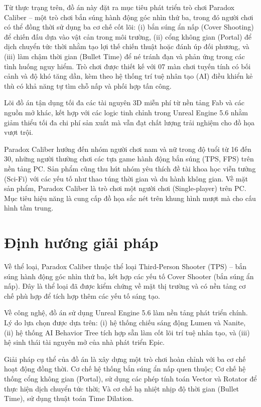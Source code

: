 \documentclass[../DoAn.tex]{subfiles}
\begin{document}
Từ thực trạng trên, đồ án này đặt ra mục tiêu phát triển trò chơi Paradox Caliber -- một trò chơi bắn súng hành động góc nhìn thứ ba, trong đó người chơi có thể đồng thời sử dụng ba cơ chế cốt lõi: (i) bắn súng ẩn nấp (Cover Shooting) để chiến đấu dựa vào vật cản trong môi trường, (ii) cổng không gian (Portal) để dịch chuyển tức thời nhằm tạo lợi thế chiến thuật hoặc đánh úp đối phương, và (iii) làm chậm thời gian (Bullet Time) để né tránh đạn và phản ứng trong các tình huống nguy hiểm. Trò chơi được thiết kế với 07 màn chơi tuyến tính có bối cảnh và độ khó tăng dần, kèm theo hệ thống trí tuệ nhân tạo (AI) điều khiển kẻ thù có khả năng tự tìm chỗ nấp và phối hợp tấn công.

Lõi đồ án tận dụng tối đa các tài nguyên 3D miễn phí từ nền tảng Fab và các nguồn mở khác, kết hợp với các logic tinh chỉnh trong Unreal Engine 5.6 nhằm giảm thiểu tối đa chi phí sản xuất mà vẫn đạt chất lượng trải nghiệm cho đồ họa vượt trội.

Paradox Caliber hướng đến nhóm người chơi nam và nữ trong độ tuổi từ 16 đến 30, những người thường chơi các tựa game hành động bắn súng (TPS, FPS) trên nền tảng PC. Sản phẩm cũng thu hút nhóm yêu thích đề tài khoa học viễn tưởng (Sci-Fi) với các yếu tố như thao túng thời gian và du hành không gian. Về mặt sản phẩm, Paradox Caliber là trò chơi một người chơi (Single-player) trên PC. Mục tiêu hiệu năng là cung cấp đồ họa sắc nét trên khung hình mượt mà cho cấu hình tầm trung.

\section{Định hướng giải pháp}
\label{section:1.3}

Về thể loại, Paradox Caliber thuộc thể loại Third-Person Shooter (TPS) -- bắn súng hành động góc nhìn thứ ba, kết hợp các yếu tố Cover Shooter (bắn súng ẩn nấp). Đây là thể loại đã được kiểm chứng về mặt thị trường và có nền tảng cơ chế phù hợp để tích hợp thêm các yếu tố sáng tạo.

Về công nghệ, đồ án sử dụng Unreal Engine 5.6 làm nền tảng phát triển chính. Lý do lựa chọn được dựa trên: (i) hệ thống chiếu sáng động Lumen và Nanite, (ii) hệ thống AI Behavior Tree tích hợp sẵn làm cốt lõi trí tuệ nhân tạo, và (iii) hệ sinh thái tài nguyên mở của nhà phát triển Epic.

Giải pháp cụ thể của đồ án là xây dựng một trò chơi hoàn chỉnh với ba cơ chế hoạt động đồng thời. Cơ chế hệ thống bắn súng ẩn nấp quen thuộc; Cơ chế hệ thống cổng không gian (Portal), sử dụng các phép tính toán Vector và Rotator để thực hiện dịch chuyển tức thời; Và cơ chế hạ nhiệt nhịp độ thời gian (Bullet Time), sử dụng thuật toán Time Dilation.
\end{document}
